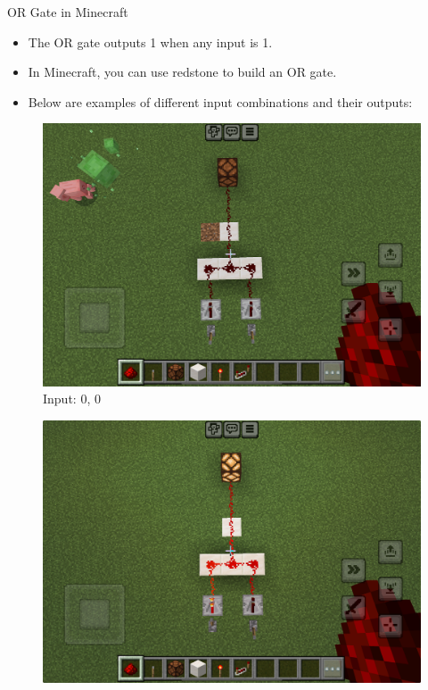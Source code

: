 \documentclass{beamer}
\begin{document}
\begin{frame}{OR Gate in Minecraft}
    \begin{itemize}
        \item The OR gate outputs 1 when any input is 1.
        \item In Minecraft, you can use redstone to build an OR gate.
        \item Below are examples of different input combinations and their outputs:
    \end{itemize}
    \begin{figure}[ht]
        \centering
        \begin{minipage}{0.32\textwidth}
            \centering
            \includegraphics[width=\textwidth]{images/orgate_00.PNG}\\
            \small Input: 0, 0
        \end{minipage}
        \begin{minipage}{0.32\textwidth}
            \centering
            \includegraphics[width=\textwidth]{images/orgate_01.png}\\

\end{minipage}
\end{figure}
\end{frame}
\end{document}
